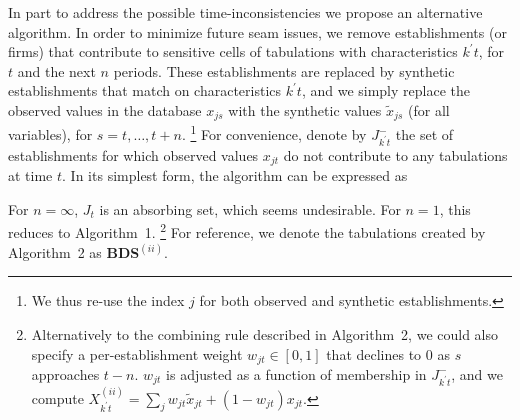 In part to address the possible time-inconsistencies we propose an 
alternative algorithm.  In order to minimize future seam issues, we remove establishments (or 
firms) that 
contribute to sensitive cells of tabulations with characteristics $k^\prime t$, for $t$ and the next 
$n$ periods. These establishments are replaced by  synthetic establishments that match on 
characteristics $k^\prime t$, and we simply replace the observed values in the database $x_{js}$ 
with the synthetic values $\tilde{x}_{js}$ (for all variables), for $s=t,\dots,t+n$.%
\footnote{We thus re-use the index $j$ for both observed and synthetic establishments.}
For convenience, denote by $J_{k^\prime t}^-$ the set of establishments for which observed values $x_{jt}$ do not contribute to any tabulations at time $t$.  In its simplest form, the algorithm can be expressed as
\begin{algorithm}
\begin{algorithmic}
\EndIf
{}

\end{algorithmic}
\end{algorithm}

For $n=\infty$, $J_{t}$ is an absorbing set, which seems undesirable. For $n=1$, this reduces  to Algorithm~1.%
\footnote{Alternatively to the combining rule described in Algorithm~2, we could also specify  a per-establishment weight $w_{jt} \in [0,1]$ that declines to $0$ 
as $s$ approaches $t-n$. $w_{jt}$ is adjusted as a function of membership in $J_{k^\prime t}^-$, 
and we compute $X_{k^\prime t}^{(ii)} = \sum_{j} w_{jt}\tilde{x}_{jt} + (1-w_{jt} )x_{jt}$. } 
For reference, we denote the tabulations created by Algorithm~2 as \textbf{BDS$^{(ii)}$}.
